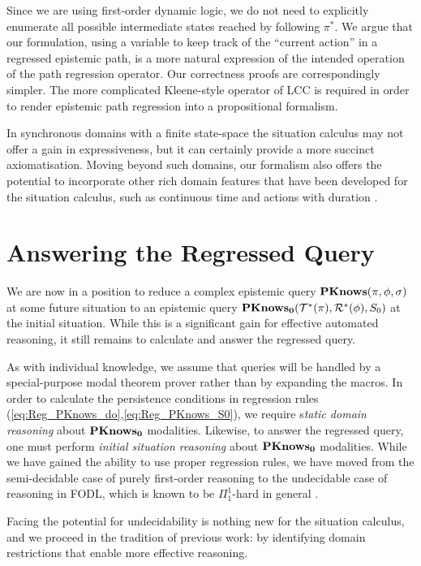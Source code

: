 Since we are using first-order dynamic logic, we do not need to explicitly
enumerate all possible intermediate states reached by following $\pi^{*}$.
We argue that our formulation, using a variable to keep track of the
{}``current action'' in a regressed epistemic path, is a more natural
expression of the intended operation of the path regression operator.
Our correctness proofs are correspondingly simpler. The more complicated
Kleene-style operator of LCC is required in order to render epistemic
path regression into a propositional formalism.

In synchronous domains with a finite state-space the situation calculus
may not offer a gain in expressiveness, but it can certainly provide
a more succinct axiomatisation. Moving beyond such domains, our formalism
also offers the potential to incorporate other rich domain features
that have been developed for the situation calculus, such as continuous
time and actions with duration \citep{reiter96sc_nat_conc}.


\section{Answering the Regressed Query\label{sec:CKnowledge:Reasoning}}

We are now in a position to reduce a complex epistemic query $\mathbf{PKnows}(\pi,\phi,\sigma)$
at some future situation to an epistemic query $\mathbf{PKnows_{0}}(\mathcal{T}^{*}(\pi),\mathcal{R}^{*}(\phi),S_{0})$
at the initial situation. While this is a significant gain for effective
automated reasoning, it still remains to calculate and answer the
regressed query.

As with individual knowledge, we assume that queries will be handled
by a special-purpose modal theorem prover rather than by expanding
the macros. In order to calculate the persistence conditions in regression
rules (\ref{eq:Reg_PKnows_do},\ref{eq:Reg_PKnows_S0}), we require
s\emph{tatic domain reasoning} about $\mathbf{PKnows_{0}}$ modalities. Likewise,
to answer the regressed query, one must perform \emph{initial situation
reasoning} about $\mathbf{PKnows_{0}}$ modalities. While we have gained the
ability to use proper regression rules, we have moved from the semi-decidable
case of purely first-order reasoning to the undecidable case of reasoning
in FODL, which is known to be $\Pi_{1}^{1}$-hard in general \citep{kooi07dyn_termmodal_logic}.

Facing the potential for undecidability is nothing new for the situation
calculus, and we proceed in the tradition of previous work: by identifying
domain restrictions that enable more effective reasoning.\\


